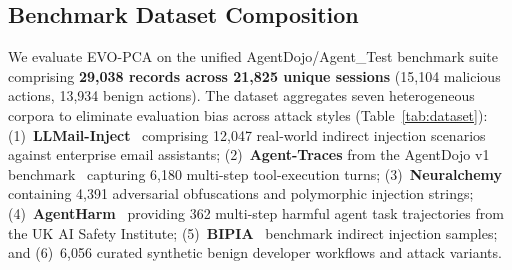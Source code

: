 \documentclass[conference]{IEEEtran}
\begin{document}
\subsection{Benchmark Dataset Composition}
We evaluate EVO-PCA on the unified AgentDojo/Agent\_Test benchmark suite comprising \textbf{29,038 records across 21,825 unique sessions} (15,104 malicious actions, 13,934 benign actions). The dataset aggregates seven heterogeneous corpora to eliminate evaluation bias across attack styles (Table~\ref{tab:dataset}): (1)~\textbf{LLMail-Inject}~\cite{llmail2024} comprising 12,047 real-world indirect injection scenarios against enterprise email assistants; (2)~\textbf{Agent-Traces} from the AgentDojo v1 benchmark~\cite{agentdojo2024} capturing 6,180 multi-step tool-execution turns; (3)~\textbf{Neuralchemy}~\cite{neuralchemy2024} containing 4,391 adversarial obfuscations and polymorphic injection strings; (4)~\textbf{AgentHarm}~\cite{agentharm2024} providing 362 multi-step harmful agent task trajectories from the UK AI Safety Institute; (5)~\textbf{BIPIA}~\cite{bipia2024} benchmark indirect injection samples; and (6)~6,056 curated synthetic benign developer workflows and attack variants.

\begin{table}[t]
\caption{Benchmark Dataset Composition (29,038 Records)}
\label{tab:dataset}
\centering
{}
\end{table}
\end{document}
